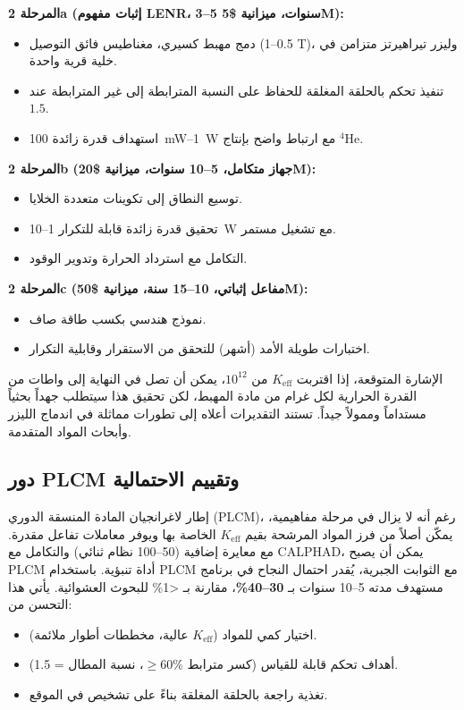 \documentclass[11pt,a4paper]{article}
\newcommand{\Keff}{K_{\mathrm{eff}}}
\theoremstyle{remark}
\begin{document}
	\textbf{المرحلة 2a (إثبات مفهوم LENR، 3–5 سنوات، ميزانية \$5M):}
	\begin{itemize}
		\item دمج مهبط كسيري، مغناطيس فائق التوصيل (0.5–1 T)، وليزر تيراهيرتز متزامن في خلية قرية واحدة.
		\item تنفيذ تحكم بالحلقة المغلقة للحفاظ على النسبة المترابطة إلى غير المترابطة عند \(1.5\).
		\item استهداف قدرة زائدة 100~mW--1~W مع ارتباط واضح بإنتاج \(^4\)He.
	\end{itemize}
	
	\textbf{المرحلة 2b (جهاز متكامل، 5–10 سنوات، ميزانية \$20M):}
	\begin{itemize}
		\item توسيع النطاق إلى تكوينات متعددة الخلايا.
		\item تحقيق قدرة زائدة قابلة للتكرار 1--10~W مع تشغيل مستمر.
		\item التكامل مع استرداد الحرارة وتدوير الوقود.
	\end{itemize}
	
	\textbf{المرحلة 2c (مفاعل إثباتي، 10–15 سنة، ميزانية \$50M):}
	\begin{itemize}
		\item نموذج هندسي بكسب طاقة صاف.
		\item اختبارات طويلة الأمد (أشهر) للتحقق من الاستقرار وقابلية التكرار.
	\end{itemize}
	
	الإشارة المتوقعة، إذا اقتربت \(\Keff\) من \(10^{12}\)، يمكن أن تصل في النهاية إلى واطات من القدرة الحرارية لكل غرام من مادة المهبط، لكن تحقيق هذا سيتطلب جهداً بحثياً مستداماً وممولاً جيداً. تستند التقديرات أعلاه إلى تطورات مماثلة في اندماج الليزر وأبحاث المواد المتقدمة.
	
	\subsection{دور PLCM وتقييم الاحتمالية}
	
	إطار لاغرانجيان المادة المنسقة الدوري (PLCM)، رغم أنه لا يزال في مرحلة مفاهيمية، يمكّن أصلاً من فرز المواد المرشحة بقيم \(K_{\mathrm{eff}}\) الخاصة بها ويوفر معاملات تفاعل مقدرة. مع معايرة إضافية (50–100 نظام ثنائي) والتكامل مع CALPHAD، يمكن أن يصبح PLCM أداة تنبؤية. باستخدام PLCM مع الثوابت الجبرية، يُقدر احتمال النجاح في برنامج مستهدف مدته 5–10 سنوات بـ \textbf{30–40\%}، مقارنة بـ <1\% للبحوث العشوائية. يأتي هذا التحسن من:
	\begin{itemize}
		\item اختيار كمي للمواد (\(K_{\mathrm{eff}}\) عالية، مخططات أطوار ملائمة).
		\item أهداف تحكم قابلة للقياس (كسر مترابط $\geq 60\%$، نسبة المطال = 1.5).
		\item تغذية راجعة بالحلقة المغلقة بناءً على تشخيص في الموقع.
	\end{itemize}
	
\end{document}
